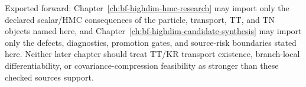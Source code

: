 Exported forward: Chapter~\ref{ch:bf-highdim-hmc-research} may import only the
declared scalar/HMC consequences of the particle, transport, TT, and TN objects
named here, and Chapter~\ref{ch:bf-highdim-candidate-synthesis} may import only
the defects, diagnostics, promotion gates, and source-risk boundaries stated
here.  Neither later chapter should treat TT/KR transport existence,
branch-local differentiability, or covariance-compression feasibility as stronger
than these checked sources support.
